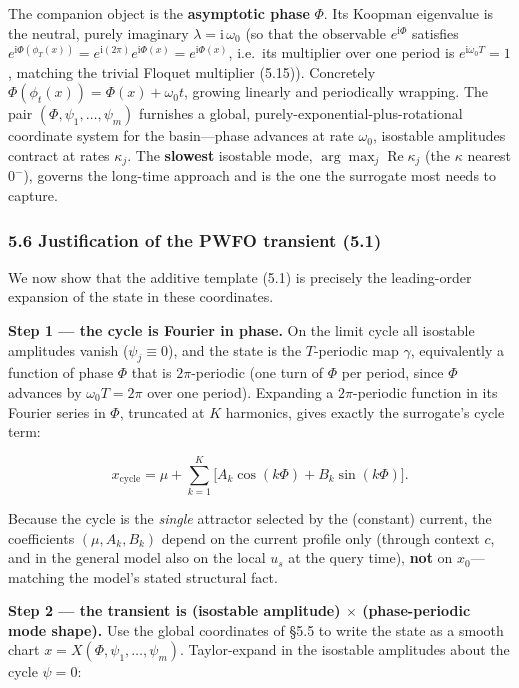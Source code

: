 \documentclass[
  11pt,
]{article}
\begin{document}
The companion object is the \textbf{asymptotic phase} \(\Phi\). Its
Koopman eigenvalue is the neutral, purely imaginary
\(\lambda=\mathrm{i}\,\omega_0\) (so that the observable
\(e^{\mathrm{i}\Phi}\) satisfies
\(e^{\mathrm{i}\Phi(\phi_T(x))}=e^{\mathrm{i}(2\pi)}e^{\mathrm{i}\Phi(x)}=e^{\mathrm{i}\Phi(x)}\),
i.e.~its multiplier over one period is \(e^{\mathrm{i}\omega_0 T}=1\),
matching the trivial Floquet multiplier (5.15)). Concretely
\(\Phi(\phi_t(x))=\Phi(x)+\omega_0 t\), growing linearly and
periodically wrapping. The pair \((\Phi,\psi_1,\dots,\psi_m)\) furnishes
a global, purely-exponential-plus-rotational coordinate system for the
basin---phase advances at rate \(\omega_0\), isostable amplitudes
contract at rates \(\kappa_j\). The \textbf{slowest} isostable mode,
\(\arg\max_j\operatorname{Re}\kappa_j\) (the \(\kappa\) nearest
\(0^-\)), governs the long-time approach and is the one the surrogate
most needs to capture.

\subsubsection{5.6 Justification of the PWFO transient
(5.1)}\label{justification-of-the-pwfo-transient-5.1}

We now show that the additive template (5.1) is precisely the
leading-order expansion of the state in these coordinates.

\textbf{Step 1 --- the cycle is Fourier in phase.} On the limit cycle
all isostable amplitudes vanish (\(\psi_j\equiv0\)), and the state is
the \(T\)-periodic map \(\gamma\), equivalently a function of phase
\(\Phi\) that is \(2\pi\)-periodic (one turn of \(\Phi\) per period,
since \(\Phi\) advances by \(\omega_0 T=2\pi\) over one period).
Expanding a \(2\pi\)-periodic function in its Fourier series in
\(\Phi\), truncated at \(K\) harmonics, gives exactly the surrogate's
cycle term:

\[
x_{\text{cycle}}=\mu+\sum_{k=1}^{K}\big[A_k\cos(k\Phi)+B_k\sin(k\Phi)\big].
\tag{5.25}
\]

Because the cycle is the \emph{single} attractor selected by the
(constant) current, the coefficients \((\mu,A_k,B_k)\) depend on the
current profile only (through context \(c\), and in the general model
also on the local \(u_s\) at the query time), \textbf{not} on
\(x_0\)---matching the model's stated structural fact.

\textbf{Step 2 --- the transient is (isostable amplitude) \(\times\)
(phase-periodic mode shape).} Use the global coordinates of §5.5 to
write the state as a smooth chart \(x=X(\Phi,\psi_1,\dots,\psi_m)\).
Taylor-expand in the isostable amplitudes about the cycle \(\psi=0\):
\end{document}
